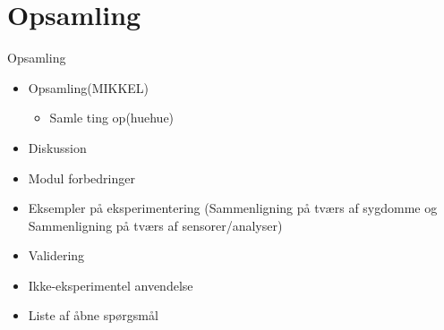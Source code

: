 \section{Opsamling}
\begin{frame}{Opsamling}
\begin{itemize}
\item Opsamling(MIKKEL)
\begin{itemize}
\item Samle ting op(huehue)
\end{itemize}
\item Diskussion
\item Modul forbedringer
\item Eksempler på eksperimentering (Sammenligning på tværs af sygdomme og Sammenligning på tværs af sensorer/analyser)
\item Validering
\item Ikke-eksperimentel anvendelse
\item Liste af åbne spørgsmål
\end{itemize}
\end{frame}
